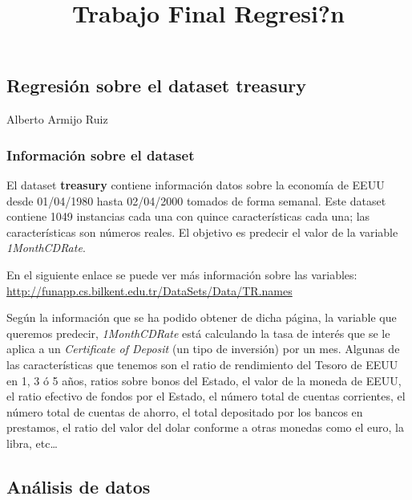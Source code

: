 \documentclass[11pt]{article}
\title{Trabajo Final Regresi?n}
\begin{document}
    
    
    \maketitle
    
    

    
    \hypertarget{regresiuxf3n-sobre-el-dataset-treasury}{%
\subsection{Regresión sobre el dataset
treasury}\label{regresiuxf3n-sobre-el-dataset-treasury}}

Alberto Armijo Ruiz

    \hypertarget{informaciuxf3n-sobre-el-dataset}{%
\subsubsection{Información sobre el
dataset}\label{informaciuxf3n-sobre-el-dataset}}

El dataset \textbf{treasury} contiene información datos sobre la
economía de EEUU desde 01/04/1980 hasta 02/04/2000 tomados de forma
semanal. Este dataset contiene 1049 instancias cada una con quince
características cada una; las características son números reales. El
objetivo es predecir el valor de la variable \emph{1MonthCDRate}.

En el siguiente enlace se puede ver más información sobre las variables:
\url{http://funapp.cs.bilkent.edu.tr/DataSets/Data/TR.names}

Según la información que se ha podido obtener de dicha página, la
variable que queremos predecir, \emph{1MonthCDRate} está calculando la
tasa de interés que se le aplica a un \emph{Certificate of Deposit} (un
tipo de inversión) por un mes. Algunas de las características que
tenemos son el ratio de rendimiento del Tesoro de EEUU en 1, 3 ó 5 años,
ratios sobre bonos del Estado, el valor de la moneda de EEUU, el ratio
efectivo de fondos por el Estado, el número total de cuentas corrientes,
el número total de cuentas de ahorro, el total depositado por los bancos
en prestamos, el ratio del valor del dolar conforme a otras monedas como
el euro, la libra, etc\ldots{}

    \hypertarget{anuxe1lisis-de-datos}{%
\subsection{Análisis de datos}\label{anuxe1lisis-de-datos}}
\end{document}
